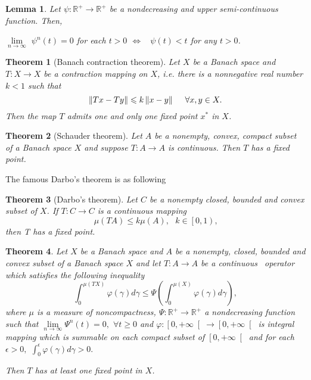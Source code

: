 \documentclass{amsart}
\newtheorem{theorem}{Theorem}
\theoremstyle{plain}
\newtheorem{lemma}{Lemma}
\numberwithin{equation}{section}
\begin{document}
\begin{lemma}
\cite{aghabanas}\label{lem} Let $\psi :\mathbb{R}^{+}\rightarrow \mathbb{R}^{+}$ be a nondecreasing and upper semi-continuous function. Then,

$\lim\limits_{n\rightarrow \infty }$ $\psi ^{n}\left( t\right) =0$ for each $t>0$ $\Leftrightarrow $ \ $\psi \left( t\right) <t$ for any $t>0$.
\end{lemma}

\begin{theorem}[Banach contraction theorem]
\cite{agarwal} Let $X$ be a Banach space and $T:X\rightarrow X$ be a
contraction mapping on $X$, i.e. there is a nonnegative real number $k<1$
such that 
\begin{equation*}
\left\Vert Tx-Ty\right\Vert \leqslant k\left\Vert x-y\right\Vert \text{ \ \
\ }\forall x,y\in X.
\end{equation*}Then the map $T$ admits one and only one fixed point $x^{\ast }$ in $X$.
\end{theorem}

\begin{theorem}[Schauder theorem]
\cite{agarwal} Let $A$ be a nonempty, convex, compact subset of a Banach
space $X$ and suppose $T:A\rightarrow A$ is continuous. Then $T$ has a fixed
point.
\end{theorem}

The famous Darbo's theorem is as following

\begin{theorem}[Darbo's theorem]
\cite{lec.note} Let $C$ be a nonempty closed, bounded and convex subset of $X $. If $T:C\rightarrow C$ is a continuous mapping 
\begin{equation*}
\mu \left( TA\right) \leqslant k\mu \left( A\right) ,\text{ \ }k\in \left[
0,1\right) \text{,}
\end{equation*}then T has a fixed point.
\end{theorem}

\begin{theorem}
\cite{agha} Let $X$ be a Banach space and $A$ be a nonempty, closed, bounded
and convex subset of a Banach space $X$ and let $T:A\rightarrow A$ be a
continuous \ operator which satisfies the following inequality\begin{equation*}
\int_{0}^{\mu \left( TX\right) }\varphi \left( \gamma \right) d\gamma
\leqslant \Psi \left( \int_{0}^{\mu \left( X\right) }\varphi \left( \gamma
\right) d\gamma \right) ,
\end{equation*}where $\mu $ is a measure of noncompactness, $\Psi :\mathbb{R}^{+}\rightarrow \mathbb{R}^{+}$ a nondecreasing function such that $\lim\limits_{n\rightarrow \infty }\Psi ^{n}\left( t\right) =0,$ $\forall
t\geqslant 0$ and $\varphi :\left[ 0,+\infty \right[ \rightarrow \left[
0,+\infty \right[ $ is integral mapping which is summable on each compact
subset of $\left[ 0,+\infty \right[ $ and for each $\epsilon >0,$ $\int_{0}^{\epsilon }\varphi \left( \gamma \right) d\gamma >0.$

Then $T$ has at least one fixed point in $X$.
\end{theorem}
\end{document}
